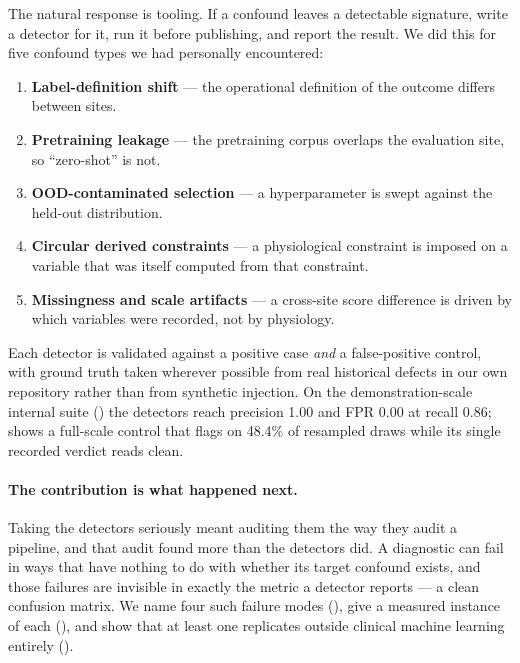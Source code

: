 \documentclass[pmlr,twocolumn,10pt]{jmlr}
\begin{document}
The natural response is tooling. If a confound leaves a detectable signature,
write a detector for it, run it before publishing, and report the result. We did
this for five confound types we had personally encountered:

\begin{enumerate}
\itemsep0em
  \item \textbf{Label-definition shift} --- the operational definition of the
    outcome differs between sites.
  \item \textbf{Pretraining leakage} --- the pretraining corpus overlaps the
    evaluation site, so ``zero-shot'' is not.
  \item \textbf{OOD-contaminated selection} --- a hyperparameter is swept
    against the held-out distribution.
  \item \textbf{Circular derived constraints} --- a physiological constraint is
    imposed on a variable that was itself computed from that constraint.
  \item \textbf{Missingness and scale artifacts} --- a cross-site score
    difference is driven by which variables were recorded, not by physiology.
\end{enumerate}

Each detector is validated against a positive case \emph{and} a false-positive
control, with ground truth taken wherever possible from real historical defects
in our own repository rather than from synthetic injection. On the
demonstration-scale internal suite () the detectors reach
precision 1.00 and FPR 0.00 at recall 0.86;  shows a
full-scale control that flags on 48.4\% of resampled draws while its single
recorded verdict reads clean.

\paragraph{The contribution is what happened next.} Taking the detectors
seriously meant auditing them the way they audit a pipeline, and that audit
found more than the detectors did. A diagnostic can fail in ways that have
nothing to do with whether its target confound exists, and those failures are
invisible in exactly the metric a detector reports --- a clean confusion matrix.
We name four such failure modes (), give a measured
instance of each (), and show that at least one
replicates outside clinical machine learning entirely
().
\end{document}
